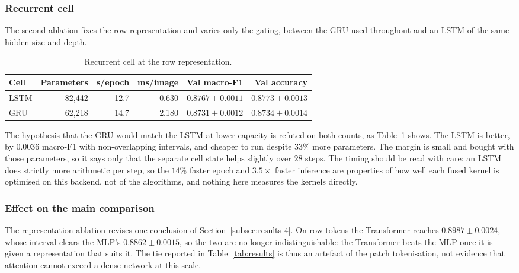 \subsubsection{Recurrent cell}
\label{subsubsec:ablation-cell}

The second ablation fixes the row representation and varies only the gating, between the GRU used
throughout and an LSTM of the same hidden size and depth.

\begin{table}[H]
\centering
\caption{Recurrent cell at the row representation.}
\label{tab:ablation-cell}
\begin{tabular}{lrrrrr}
\hline
\textbf{Cell} & \textbf{Parameters} & \textbf{s/epoch} & \textbf{ms/image} & \textbf{Val macro-F1} & \textbf{Val accuracy} \\
\hline
LSTM & 82{,}442 & 12.7 & 0.630 & $\mathbf{0.8767 \pm 0.0011}$ & $\mathbf{0.8773 \pm 0.0013}$ \\
GRU  & 62{,}218 & 14.7 & 2.180 & $0.8731 \pm 0.0012$ & $0.8734 \pm 0.0014$ \\
\hline
\end{tabular}
\end{table}

The hypothesis that the GRU would match the LSTM at lower capacity is refuted on both counts, as
Table~\ref{tab:ablation-cell} shows. The LSTM is better, by $0.0036$ macro-F1 with
non-overlapping intervals, and cheaper to run despite $33\%$ more parameters. The margin is small
and bought with those parameters, so it says only that the separate cell state helps slightly
over $28$ steps. The timing should be read with care: an LSTM does strictly more arithmetic per
step, so the $14\%$ faster epoch and $3.5\times$ faster inference are properties of how well each
fused kernel is optimised on this backend, not of the algorithms, and nothing here measures the
kernels directly.

\subsubsection{Effect on the main comparison}
\label{subsubsec:ablation-effect}

The representation ablation revises one conclusion of Section~\ref{subsec:results-4}. On row
tokens the Transformer reaches $0.8987 \pm 0.0024$, whose interval clears the MLP's
$0.8862 \pm 0.0015$, so the two are no longer indistinguishable: the Transformer beats the MLP
once it is given a representation that suits it. The tie reported in Table~\ref{tab:results} is
thus an artefact of the patch tokenisation, not evidence that attention cannot exceed a dense
network at this scale.

